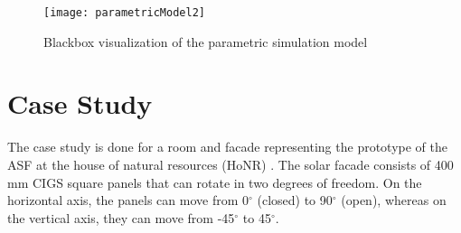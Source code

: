 			\begin{figure}[ht] %
				\begin{center}
				\texttt{[image: parametricModel2]}
				\caption{Blackbox visualization of the parametric simulation model}
				\label{fig:parametricModel}
				\end{center} 
			\end{figure}

	\section{Case Study}

		The case study is done for a room and facade representing the prototype of the ASF at the house of natural resources (HoNR) \cite{nagy2016}.  The solar facade consists of 400\,mm CIGS square panels that can rotate in two degrees of freedom. On the horizontal axis, the panels can move from 0$^{\circ}$ (closed) to 90$^{\circ}$ (open), whereas on the vertical axis, they can move from -45$^{\circ}$ to 45$^{\circ}$. %



